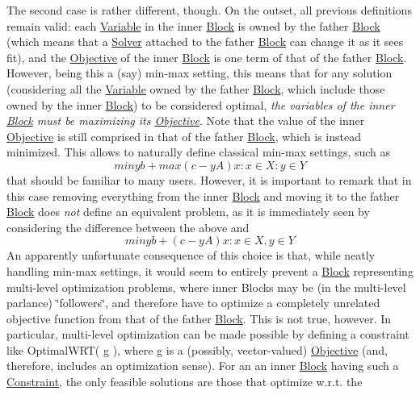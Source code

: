 The second case is rather different, though. On the outset, all previous definitions remain valid\+: each \mbox{\hyperlink{class_s_m_spp__di__unipi__it_1_1_variable}{Variable}} in the inner \mbox{\hyperlink{class_s_m_spp__di__unipi__it_1_1_block}{Block}} is owned by the father \mbox{\hyperlink{class_s_m_spp__di__unipi__it_1_1_block}{Block}} (which means that a \mbox{\hyperlink{class_s_m_spp__di__unipi__it_1_1_solver}{Solver}} attached to the father \mbox{\hyperlink{class_s_m_spp__di__unipi__it_1_1_block}{Block}} can change it as it sees fit), and the \mbox{\hyperlink{class_s_m_spp__di__unipi__it_1_1_objective}{Objective}} of the inner \mbox{\hyperlink{class_s_m_spp__di__unipi__it_1_1_block}{Block}} is one term of that of the father \mbox{\hyperlink{class_s_m_spp__di__unipi__it_1_1_block}{Block}}. However, being this a (say) min-\/max setting, this means that for any solution (considering all the \mbox{\hyperlink{class_s_m_spp__di__unipi__it_1_1_variable}{Variable}} owned by the father \mbox{\hyperlink{class_s_m_spp__di__unipi__it_1_1_block}{Block}}, which include those owned by the inner \mbox{\hyperlink{class_s_m_spp__di__unipi__it_1_1_block}{Block}}) to be considered optimal, {\itshape the variables of the inner \mbox{\hyperlink{class_s_m_spp__di__unipi__it_1_1_block}{Block}} must be maximizing its \mbox{\hyperlink{class_s_m_spp__di__unipi__it_1_1_objective}{Objective}}}. Note that the value of the inner \mbox{\hyperlink{class_s_m_spp__di__unipi__it_1_1_objective}{Objective}} is still comprised in that of the father \mbox{\hyperlink{class_s_m_spp__di__unipi__it_1_1_block}{Block}}, which is instead minimized. This allows to naturally define classical min-\/max settings, such as \[ min { yb + max { ( c - yA ) x : x \in X } : y \in Y } \] that should be familiar to many users. However, it is important to remark that in this case removing everything from the inner \mbox{\hyperlink{class_s_m_spp__di__unipi__it_1_1_block}{Block}} and moving it to the father \mbox{\hyperlink{class_s_m_spp__di__unipi__it_1_1_block}{Block}} does {\itshape not} define an equivalent problem, as it is immediately seen by considering the difference between the above and \[ min { yb + ( c - yA ) x : x \in X , y \in Y } \] An apparently unfortunate consequence of this choice is that, while neatly handling min-\/max settings, it would seem to entirely prevent a \mbox{\hyperlink{class_s_m_spp__di__unipi__it_1_1_block}{Block}} representing multi-\/level optimization problems, where inner Blocks may be (in the multi-\/level parlance) \char`\"{}followers\char`\"{}, and therefore have to optimize a completely unrelated objective function from that of the father \mbox{\hyperlink{class_s_m_spp__di__unipi__it_1_1_block}{Block}}. This is not true, however. In particular, multi-\/level optimization can be made possible by defining a constraint like Optimal\+W\+R\+T( g ), where g is a (possibly, vector-\/valued) \mbox{\hyperlink{class_s_m_spp__di__unipi__it_1_1_objective}{Objective}} (and, therefore, includes an optimization sense). For an an inner \mbox{\hyperlink{class_s_m_spp__di__unipi__it_1_1_block}{Block}} having such a \mbox{\hyperlink{class_s_m_spp__di__unipi__it_1_1_constraint}{Constraint}}, the only feasible solutions are those that optimize w.\+r.\+t. the 